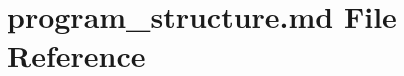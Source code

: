 \hypertarget{program__structure_8md}{}\section{program\+\_\+structure.\+md File Reference}
\label{program__structure_8md}
